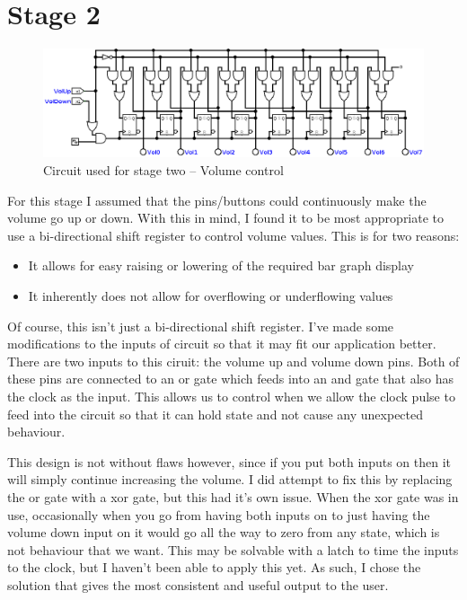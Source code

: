 \documentclass[11pt]{scrartcl}
\begin{document}
\section*{Stage 2}
\begin{figure}
    \centering
    \includegraphics[scale=0.372]{images/stagetwo.png}
    \caption{Circuit used for stage two -- Volume control}
\end{figure}
For this stage I assumed that the pins/buttons could continuously make the volume go
up or down. With this in mind, I found it to be most appropriate to use a bi-directional
shift register to control volume values. This is for two reasons:

\begin{itemize}
    \item It allows for easy raising or lowering of the required bar graph display
    \item It inherently does not allow for overflowing or underflowing values
\end{itemize}

Of course, this isn't just a bi-directional shift register. I've made some modifications to
the inputs of circuit so that it may fit our application better. There are two inputs to
this ciruit: the volume up and volume down pins. Both of these pins are connected to an
or gate which feeds into an and gate that also has the clock as the input. This allows us
to control when we allow the clock pulse to feed into the circuit so that it can hold state
and not cause any unexpected behaviour.

\bigskip

This design is not without flaws however, since if you put both inputs on then it will simply
continue increasing the volume. I did attempt to fix this by replacing the or gate with a
xor gate, but this had it's own issue. When the xor gate was in use, occasionally when you go
from having both inputs on to just having the volume down input on it would go all the way to
zero from any state, which is not behaviour that we want. This may be solvable with a latch
to time the inputs to the clock, but I haven't been able to apply this yet. As such, I chose
the solution that gives the most consistent and useful output to the user.
\end{document}
